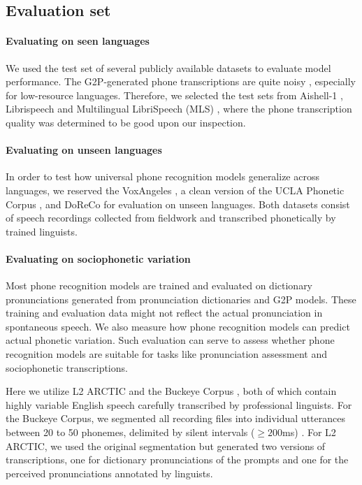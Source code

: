 \documentclass[11pt]{article}
\begin{document}
\subsection{Evaluation set}
\paragraph{Evaluating on seen languages}
We used the test set of several publicly available datasets to evaluate model performance. The G2P-generated phone transcriptions are quite noisy \citep{samir2024efficiently}, especially for low-resource languages. Therefore, we selected the test sets from Aishell-1 \cite{bu2017aishell}, Librispeech \cite{panayotov2015librispeech} and Multilingual LibriSpeech (MLS) \cite{pratap20_interspeech}, where the phone transcription quality was determined to be good upon our inspection. 

\paragraph{Evaluating on unseen languages}
In order to test how universal phone recognition models generalize across languages, we reserved the VoxAngeles \cite{chodroff-etal-2024-phonetic}, a clean version of the UCLA Phonetic Corpus \cite{li2021multilingual}, and DoReCo \cite{paschen2020building} for evaluation on unseen languages. Both datasets consist of speech recordings collected from fieldwork and transcribed phonetically by trained linguists. 

\paragraph{Evaluating on sociophonetic variation}
Most phone recognition models are trained and evaluated on dictionary pronunciations generated from pronunciation dictionaries and G2P models. These training and evaluation data might not reflect the actual pronunciation in spontaneous speech. We also measure how phone recognition models can predict actual phonetic variation. Such evaluation can serve to assess whether phone recognition models are suitable for tasks like pronunciation assessment and sociophonetic transcriptions. 

Here we utilize L2 ARCTIC \cite{zhao2018l2} and the Buckeye Corpus \cite{pitt2005buckeye}, both of which contain highly variable English speech carefully transcribed by professional linguists. For the Buckeye Corpus, we segmented all recording files into individual utterances between 20 to 50 phonemes, delimited by silent intervals ($\geq 200$ms) \cite{fuchs22_interspeech}. For L2 ARCTIC, we used the original segmentation but generated two versions of transcriptions, one for dictionary pronunciations of the prompts and one for the perceived pronunciations annotated by linguists. 
\end{document}
